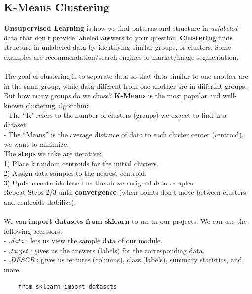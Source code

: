 \documentclass[11pt, a4paper]{article}
\begin{document}
\begin{spacing}{1.1}
	\subsection{K-Means Clustering}
	\textbf{Unsupervised Learning} is how we find patterns and structure in \textit{unlabeled} data that don't provide labeled answers to your question. \textbf{Clustering} finds structure in unlabeled data by identifying similar groups, or clusters. Some examples are recommendation/search engines or market/image segmentation. \\~\\
	The goal of clustering is to separate data so that data similar to one another are in the same group, while data different from one another are in different groups. But how many groups do we chose? \textbf{K-Means} is the most popular and well-known clustering algorithm: \\
	\hspace*{3mm}- The ``K" refers to the number of clusters (groups) we expect to find in a dataset. \\
	\hspace*{3mm}- The ``Means'' is the average distance of data to each cluster center (centroid), we want to minimize. \vspace*{1mm} \\
	The \textbf{steps} we take are iterative: \\
	\hspace*{3mm} 1) Place k random centroids for the initial clusters. \\
	\hspace*{3mm} 2) Assign data samples to the nearest centroid. \\
	\hspace*{3mm} 3) Update centroids based on the above-assigned data samples. \vspace*{1mm} \\
	Repeat Steps 2/3 until \textbf{convergence} (when points don’t move between clusters and centroids stabilize).\\~\\
	We can \textbf{import datasets from sklearn} to use in our projects. We can use the following accessors: \\
	\hspace*{3mm}- \textit{.data} : lets us view the sample data of our module.\\
	\hspace*{3mm}- \textit{.target} : gives us the answers (labels) for the corresponding data. \\
	\hspace*{3mm}- \textit{.DESCR} : gives us features (columns), class (labels), summary statistics, and more. 
	\begin{lstlisting}
	from sklearn import datasets
	

\end{lstlisting}
\end{spacing}
\end{document}

